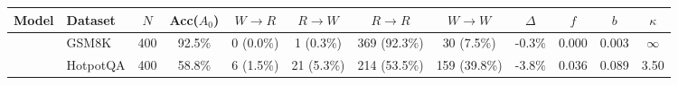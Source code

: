 \begin{tabular}{llcccccccccc}
\toprule
Model & Dataset & $N$ & Acc($A_0$) & $W\to R$ & $R\to W$ & $R\to R$ & $W\to W$ & $\Delta$ & $f$ & $b$ & $\kappa$ \\
\midrule
\modelA{} & GSM8K & 400 & 92.5\% & 0 (0.0\%) & 1 (0.3\%) & 369 (92.3\%) & 30 (7.5\%) & -0.3\% & 0.000 & 0.003 & $\infty$ \\
\modelA{} & HotpotQA & 400 & 58.8\% & 6 (1.5\%) & 21 (5.3\%) & 214 (53.5\%) & 159 (39.8\%) & -3.8\% & 0.036 & 0.089 & 3.50 \\
\bottomrule
\end{tabular}
